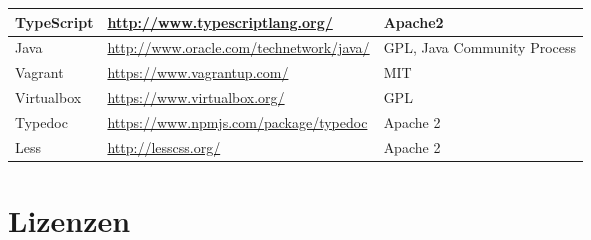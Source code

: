 \begin{landscape}
		\begin{tabularx}{\linewidth}{| l | l | X |}
			\hline
			TypeScript & \url{http://www.typescriptlang.org/} & Apache2 \\
			\hline
			Java & \url{http://www.oracle.com/technetwork/java/} & GPL, Java Community Process\\
			\hline
			Vagrant & \url{https://www.vagrantup.com/} & MIT \\
			\hline
			Virtualbox & \url{https://www.virtualbox.org/} &  GPL \\
			\hline
			Typedoc & \url{https://www.npmjs.com/package/typedoc} &  Apache 2 \\
			\hline
			Less & \url{http://lesscss.org/} &  Apache 2 \\
			\hline
		\end{tabularx}
		
			
	\section{Lizenzen}
	\label{sec:licenses}
	
	\newcommand{\addLicense}[6]{
		#1 & #2 & \url{#3} &
		\begin{itemize}%
			\setlength{\itemsep}{0pt}
	    		\setlength{\parskip}{0pt}
		    	\setlength{\parsep}{0pt}
			#4
		\end{itemize}
		 &
		 \begin{itemize}%
			\setlength{\itemsep}{0pt}
    			\setlength{\parskip}{0pt}
	  	  	\setlength{\parsep}{0pt}
			#5
		\end{itemize}
		&
		\begin{itemize}%
			\setlength{\itemsep}{0pt}
    			\setlength{\parskip}{0pt}
	   	 	\setlength{\parsep}{0pt}
			#6
		\end{itemize}
		\\
		\hline
	}


\end{landscape}
